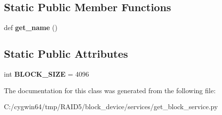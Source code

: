 \subsection*{Static Public Member Functions}
\begin{DoxyCompactItemize}
\item 
\mbox{\label{class_r_a_i_d5_1_1block__device_1_1services_1_1get__block__service_1_1_get_block_service_a813d2b4bd5bc7a7fea09475792396db2}} 
def {\bfseries get\+\_\+name} ()
\end{DoxyCompactItemize}
\subsection*{Static Public Attributes}
\begin{DoxyCompactItemize}
\item 
\mbox{\label{class_r_a_i_d5_1_1block__device_1_1services_1_1get__block__service_1_1_get_block_service_a1fc0a4b9df94443d37e48324bb0541af}} 
int {\bfseries B\+L\+O\+C\+K\+\_\+\+S\+I\+ZE} = 4096
\end{DoxyCompactItemize}


The documentation for this class was generated from the following file\+:\begin{DoxyCompactItemize}
\item 
C\+:/cygwin64/tmp/\+R\+A\+I\+D5/block\+\_\+device/services/get\+\_\+block\+\_\+service.\+py\end{DoxyCompactItemize}
